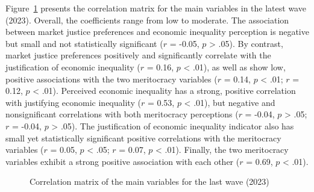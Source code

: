 \documentclass[
  12pt,
]{article}
\begin{document}
Figure~\ref{fig-matrix} presents the correlation matrix for the main
variables in the latest wave (2023). Overall, the coefficients range
from low to moderate. The association between market justice preferences
and economic inequality perception is negative but small and not
statistically significant (\(r\) = -0.05, \(p\) \textgreater{} .05). By
contrast, market justice preferences positively and significantly
correlate with the justification of economic inequality (\(r\) = 0.16,
\(p\) \textless{} .01), as well as show low, positive associations with
the two meritocracy variables (\(r\) = 0.14, \(p\) \textless{} .01;
\(r\) = 0.12, \(p\) \textless{} .01). Perceived economic inequality has
a strong, positive correlation with justifying economic inequality
(\(r\) = 0.53, \(p\) \textless{} .01), but negative and nonsignificant
correlations with both meritocracy perceptions (\(r\) = -0.04, \(p\)
\textgreater{} .05; \(r\) = -0.04, \(p\) \textgreater{} .05). The
justification of economic inequality indicator also has small yet
statistically significant positive correlations with the meritocracy
variables (\(r\) = 0.05, \(p\) \textless{} .05; \(r\) = 0.07, \(p\)
\textless{} .01). Finally, the two meritocracy variables exhibit a
strong positive association with each other (\(r\) = 0.69, \(p\)
\textless{} .01).

\begin{figure}[H]

\caption{\label{fig-matrix}Correlation matrix of the main variables for
the last wave (2023)}


\end{figure}%
\end{document}

